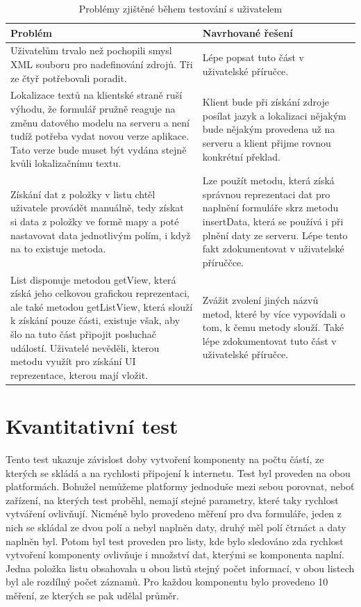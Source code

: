 \begin{table}[h!]
\begin{center}
\caption{Problémy zjištěné během testování s uživatelem}
\label{table:testIssues}
\begin{tabular}{|p{7cm}|p{7cm}|}
\hline
\textbf{Problém} & \textbf{Navrhované řešení} \\
\hline
Uživatelům trvalo než pochopili smysl XML souboru pro nadefinování zdrojů. Tři ze čtyř potřebovali poradit. & Lépe popsat tuto část v uživatelské příručce. \\
\hline
Lokalizace textů na klientské straně ruší výhodu, že formulář pružně reaguje na změnu datového modelu na serveru a není tudíž potřeba vydat novou verze aplikace. Tato verze bude muset být vydána stejně kvůli lokalizačnímu textu. & Klient bude při získání zdroje posílat jazyk a lokalizaci nějakým bude nějakým provedena už na serveru a klient přijme rovnou konkrétní překlad. \\
\hline
Získání dat z položky v listu chtěl uživatele provádět manuálně, tedy získat si data z položky ve formě mapy a poté nastavovat data jednotlivým polím, i když na to existuje metoda. & Lze použít metodu, která získá správnou reprezentaci dat pro naplnění formuláře skrz metodu insertData, která se používá i při plnění daty ze serveru. Lépe tento fakt zdokumentovat v uživatelské příruččce. \\
\hline
List disponuje metodou getView, která získá jeho celkovou grafickou reprezentaci, ale také metodou getListView, která slouží k získání pouze části, existuje však, aby šlo na tuto část připojit posluchač událostí. Uživatelé nevěděli, kterou metodu využít pro získání UI reprezentace, kterou mají vložit. & Zvážit zvolení jiných názvů metod, které by více vypovídali o tom, k čemu metody slouží. Také lépe zdokumentovat tuto část v uživatelské příručce. \\
\hline
\end{tabular}
\end{center}
\end{table}

\section{Kvantitativní test} 
Tento test ukazuje závislost doby vytvoření komponenty na počtu částí, ze kterých se skládá a na rychlosti připojení k internetu. Test byl proveden na obou platformách. Bohužel nemůžeme platformy jednoduše mezi sebou porovnat, neboť zařízení, na kterých test proběhl, nemají stejné parametry, které taky rychlost vytváření ovlivňují. Nicméně bylo provedeno měření pro dva formuláře, jeden z nich se skládal ze dvou polí a nebyl naplněn daty, druhý měl polí čtrnáct a daty naplněn byl. Potom byl test proveden pro listy, kde bylo sledováno zda rychlost vytvoření komponenty ovlivňuje i množství dat, kterými se komponenta naplní. Jedna položka listu obsahovala u obou listů stejný počet informací, v obou listech byl ale rozdílný počet záznamů. Pro každou komponentu bylo provedeno 10 měření, ze kterých se pak udělal průměr. 

